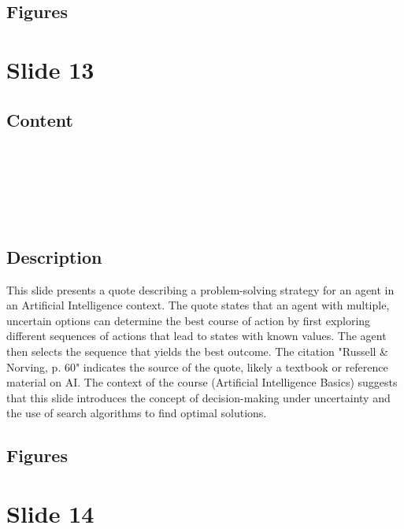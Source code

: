 \documentclass{article}%
\begin{document}
\subsection{Figures}%
\begin{figure}[H]%
\centering%
\end{figure}

%
\newpage%
\section{Slide 13}%
\label{sec:Slide13}%
\subsection{Content}%

 \\
 \\
 \\
 \\
 \\
%
\subsection{Description}%
This slide presents a quote describing a problem-solving strategy for an agent in an Artificial Intelligence context.  The quote states that an agent with multiple, uncertain options can determine the best course of action by first exploring different sequences of actions that lead to states with known values.  The agent then selects the sequence that yields the best outcome.  The citation "Russell & Norving, p. 60" indicates the source of the quote, likely a textbook or reference material on AI.  The context of the course (Artificial Intelligence Basics) suggests that this slide introduces the concept of decision-making under uncertainty and the use of search algorithms to find optimal solutions.%
\subsection{Figures}%
\begin{figure}[H]%
\centering%
\end{figure}

%
\newpage%
\section{Slide 14}%
\label{sec:Slide14}%
\end{document}

